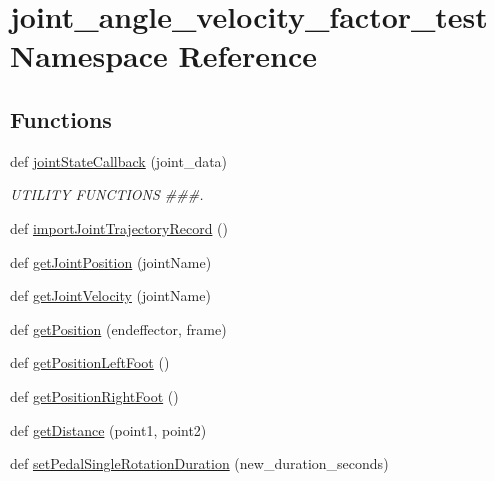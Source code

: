 \hypertarget{namespacejoint__angle__velocity__factor__test}{}\section{joint\+\_\+angle\+\_\+velocity\+\_\+factor\+\_\+test Namespace Reference}
\label{namespacejoint__angle__velocity__factor__test}
\subsection*{Functions}
\begin{DoxyCompactItemize}
\item 
def \mbox{\hyperlink{namespacejoint__angle__velocity__factor__test_a04edf9fe98b4807070a2b1e10e3d8507}{joint\+State\+Callback}} (joint\+\_\+data)
\begin{DoxyCompactList}\small\item\em U\+T\+I\+L\+I\+TY F\+U\+N\+C\+T\+I\+O\+NS \#\#\#. \end{DoxyCompactList}\item 
def \mbox{\hyperlink{namespacejoint__angle__velocity__factor__test_a7e7680d88d7ce3ae989b90b11189bf69}{import\+Joint\+Trajectory\+Record}} ()
\item 
def \mbox{\hyperlink{namespacejoint__angle__velocity__factor__test_af3a1b2e70aeffd1b80506e0ecd0ad8a6}{get\+Joint\+Position}} (joint\+Name)
\item 
def \mbox{\hyperlink{namespacejoint__angle__velocity__factor__test_adc327c55cddebfb13f71dd9ace977b3c}{get\+Joint\+Velocity}} (joint\+Name)
\item 
def \mbox{\hyperlink{namespacejoint__angle__velocity__factor__test_a17f5cd4273e0984eef1af36fb7376047}{get\+Position}} (endeffector, frame)
\item 
def \mbox{\hyperlink{namespacejoint__angle__velocity__factor__test_aecf6a0cd95ea8cc1278422057d840575}{get\+Position\+Left\+Foot}} ()
\item 
def \mbox{\hyperlink{namespacejoint__angle__velocity__factor__test_a54551231e415e9766e662b0387a56518}{get\+Position\+Right\+Foot}} ()
\item 
def \mbox{\hyperlink{namespacejoint__angle__velocity__factor__test_a40de0442d8c6fcdf8719cbedfcf43f62}{get\+Distance}} (point1, point2)
\item 
def \mbox{\hyperlink{namespacejoint__angle__velocity__factor__test_a4b7edc3596e3eab9bedf14e023ccd75b}{set\+Pedal\+Single\+Rotation\+Duration}} (new\+\_\+duration\+\_\+seconds)

\end{DoxyCompactItemize}

